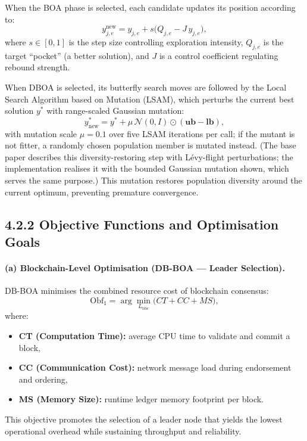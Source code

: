 When the BOA phase is selected, each candidate updates its position according to:
\begin{equation}\label{eq:boa_update}
    y^{\text{new}}_{j,e} = y_{j,e} + s \big( Q_{j,e} - J \, y_{j,e} \big),
\end{equation}
where $s \in [0,1]$ is the step size controlling exploration intensity, $Q_{j,e}$ is the target ``pocket'' (a better solution), and $J$ is a control coefficient regulating rebound strength.

When DBOA is selected, its butterfly search moves are followed by the Local Search Algorithm based on Mutation (LSAM), which perturbs the current best solution $y^*$ with range-scaled Gaussian mutation:
\begin{equation}\label{eq:dboa_levy}
    y^*_{\text{new}} = y^* + \mu\,\mathcal{N}(0, I) \odot (\mathbf{ub} - \mathbf{lb}),
\end{equation}
with mutation scale $\mu = 0.1$ over five LSAM iterations per call; if the mutant is not fitter, a randomly chosen population member is mutated instead. (The base paper describes this diversity-restoring step with L\'evy-flight perturbations; the implementation realises it with the bounded Gaussian mutation shown, which serves the same purpose.) This mutation restores population diversity around the current optimum, preventing premature convergence.

\subsection*{4.2.2 Objective Functions and Optimisation Goals}

\paragraph{(a) Blockchain-Level Optimisation (DB-BOA — Leader Selection).}
DB-BOA minimises the combined resource cost of blockchain consensus:
\begin{equation}\label{eq:obf1}
    \mathrm{Obf}_1 = \arg\min_{L_{\mathrm{bbc}}} \big( CT + CC + MS \big),
\end{equation}
where:
\begin{itemize}
    \item \textbf{CT (Computation Time):} average CPU time to validate and commit a block,
    \item \textbf{CC (Communication Cost):} network message load during endorsement and ordering,
    \item \textbf{MS (Memory Size):} runtime ledger memory footprint per block.
\end{itemize}
This objective promotes the selection of a leader node that yields the lowest operational overhead while sustaining throughput and reliability.

